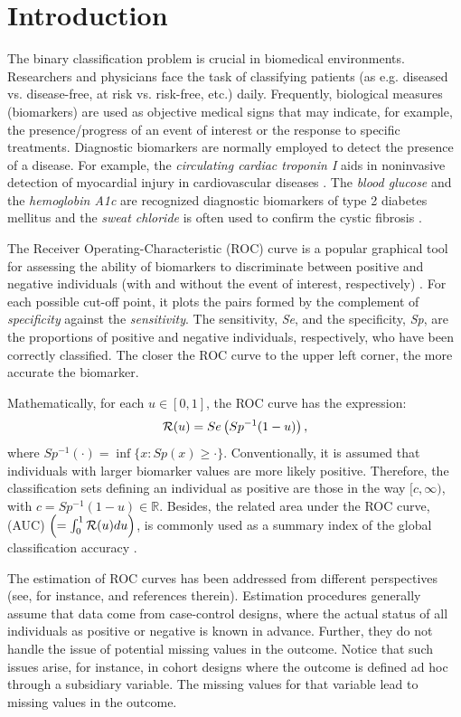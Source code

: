 \section{Introduction} \label{sec:s1}
The binary classification problem is crucial in biomedical environments. Researchers and physicians face the task of classifying patients (as e.g. diseased vs. disease-free, at risk vs. risk-free, etc.) daily. Frequently, biological measures (biomarkers) are used as objective medical signs that may indicate, for example, the presence/progress of an event of interest or the response to specific treatments.
Diagnostic biomarkers are normally employed to detect the presence of a disease. For example, the \textit{circulating cardiac troponin I} aids in noninvasive detection of myocardial injury in cardiovascular diseases \citep{Ni2018}. The \textit{blood glucose} and the \textit{hemoglobin A1c} are recognized diagnostic biomarkers of type 2 diabetes mellitus \citep{Long2020} and the \textit{sweat chloride} is often used to confirm the cystic fibrosis \citep{Farrel2008}.

The Receiver Operating-Characteristic (ROC) curve is a popular graphical tool for assessing the ability of biomarkers to discriminate between positive and negative individuals (with and without the event of interest, respectively)  \citep{Zhou2002, Pepe2003}. For each possible cut-off point, it plots the pairs formed by the complement of {\it specificity} against the {\it  sensitivity}. The sensitivity, {\it {Se}}, and the specificity, {\it {Sp}}, are the proportions of positive and negative individuals, respectively, who have been correctly classified.
The closer the ROC curve to the upper left corner, the more accurate the biomarker.

Mathematically, for each $u\in [0,1]$, the ROC curve has the expression:
\begin{equation}
{\cal R}(u)= Se\left(Sp^{-1}(1-u)\right), \label{R11}
\end{equation}
where $Sp^{-1}(\cdot) = \inf \{x: Sp(x) \geq \cdot\} $. Conventionally, it is assumed that individuals with larger biomarker values are more likely positive. Therefore, the classification sets defining an individual as positive are those in the way $[c, \infty)$, with  $c = Sp^{-1}(1-u) \in\mathbb{R} $. Besides, the related area under the ROC curve, (AUC) $\left(=\int_{0}^{1}{{\cal R}(u)du}\right)$, is commonly used as a summary index of the global classification accuracy \citep{hanl82}. 

The estimation of ROC curves has been addressed from different perspectives (see, for instance, \citet{gon14} and references therein). Estimation procedures generally assume that data come from case-control designs, where the actual status of all individuals as positive or negative is known in advance. Further, they do not handle the issue of potential missing values in the outcome. Notice that such issues arise, for instance, in cohort designs where the outcome is defined ad hoc through a subsidiary variable. The missing values for that variable lead to missing values in the outcome.


